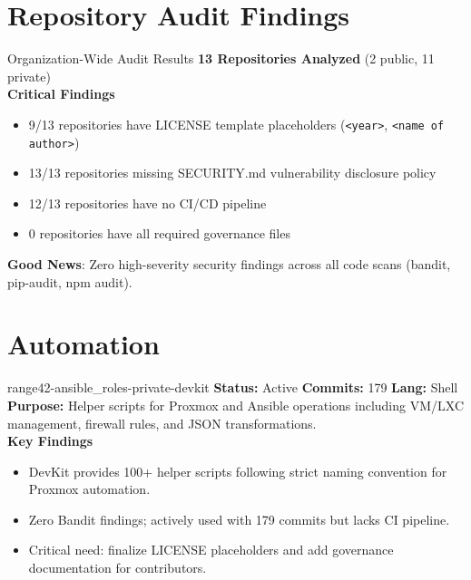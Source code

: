 \documentclass[aspectratio=169]{beamer}
\begin{document}
\section{Repository Audit Findings}

\begin{frame}{Organization-Wide Audit Results \; \faClipboardCheck}
  \textbf{13 Repositories Analyzed} (2 public, 11 private)\\[3mm]
  
  \textbf{Critical Findings}
  \begin{itemize}
    \item \alert{9/13 repositories} have LICENSE template placeholders (\texttt{<year>}, \texttt{<name of author>})
    \item \alert{13/13 repositories} missing SECURITY.md vulnerability disclosure policy
    \item \alert{12/13 repositories} have no CI/CD pipeline
    \item \alert{0 repositories} have all required governance files
  \end{itemize}
  \vspace{2mm}
  \begin{tcolorbox}
    \faCheckCircle\; \textbf{Good News}: Zero high-severity security findings across all code scans (bandit, pip-audit, npm audit).
  \end{tcolorbox}
\end{frame}

\section{Automation}

\begin{frame}{range42-ansible\_roles-private-devkit \; \faTerminal}
  \textbf{Status:} Active \hfill \textbf{Commits:} 179 \hfill \textbf{Lang:} Shell\\[2mm]
  \textbf{Purpose:} Helper scripts for Proxmox and Ansible operations including VM/LXC management, firewall rules, and JSON transformations.\\[2mm]
  \textbf{Key Findings}
  \begin{itemize}
    \item DevKit provides 100+ helper scripts following strict naming convention for Proxmox automation.
    \item Zero Bandit findings; actively used with 179 commits but lacks CI pipeline.
    \item Critical need: finalize LICENSE placeholders and add governance documentation for contributors.
  \end{itemize}
\end{frame}
\end{document}
